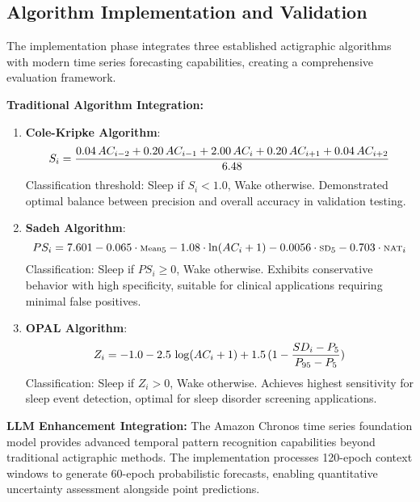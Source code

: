 \documentclass[conference]{IEEEtran}
\begin{document}
\subsection{Algorithm Implementation and Validation}
The implementation phase integrates three established actigraphic algorithms with modern time series forecasting capabilities, creating a comprehensive evaluation framework.

\textbf{Traditional Algorithm Integration:}
\begin{enumerate}
    \item \textbf{Cole-Kripke Algorithm}: 
    \begin{equation}
        \tiny
    S_i = \frac{0.04\,AC_{i-2} + 0.20\,AC_{i-1} + 2.00\,AC_i + 0.20\,AC_{i+1} + 0.04\,AC_{i+2}}{6.48}
    \end{equation}
    Classification threshold: Sleep if $S_i < 1.0$, Wake otherwise. Demonstrated optimal balance between precision and overall accuracy in validation testing.
    
    \item \textbf{Sadeh Algorithm}:
    \begin{equation}
        \scriptsize
    PS_i = 7.601 - 0.065 \cdot \text{Mean}_5 - 1.08 \cdot \ln(AC_i + 1) - 0.0056 \cdot \text{SD}_5 - 0.703 \cdot \text{NAT}_i
    \end{equation}
    Classification: Sleep if $PS_i \geq 0$, Wake otherwise. Exhibits conservative behavior with high specificity, suitable for clinical applications requiring minimal false positives.
    
    \item \textbf{OPAL Algorithm}:
    \begin{equation}
        \scriptsize
    Z_i = -1.0 - 2.5\,\log(AC_i + 1) + 1.5\,(1 - \frac{SD_i - P_5}{P_{95} - P_5})
    \end{equation}
    Classification: Sleep if $Z_i > 0$, Wake otherwise. Achieves highest sensitivity for sleep event detection, optimal for sleep disorder screening applications.
\end{enumerate}

\textbf{LLM Enhancement Integration:}
The Amazon Chronos time series foundation model provides advanced temporal pattern recognition capabilities beyond traditional actigraphic methods. The implementation processes 120-epoch context windows to generate 60-epoch probabilistic forecasts, enabling quantitative uncertainty assessment alongside point predictions.
\end{document}
